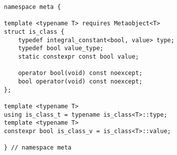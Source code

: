 
\begin{verbatim}
namespace meta {

template <typename T> requires Metaobject<T>
struct is_class {
	typedef integral_constant<bool, value> type;
	typedef bool value_type;
	static constexpr const bool value;

	operator bool(void) const noexcept;
	bool operator(void) const noexcept;
};

template <typename T>
using is_class_t = typename is_class<T>::type;
template <typename T>
constexpr bool is_class_v = is_class<T>::value;

} // namespace meta
\end{verbatim}
